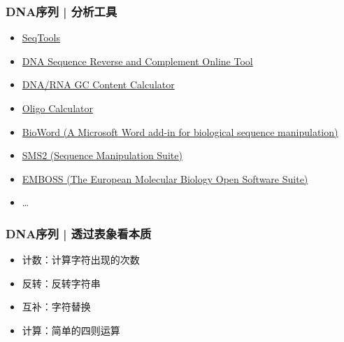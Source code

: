 \begin{frame}
  \frametitle{DNA序列 | 分析工具}
  \begin{itemize}
    \item \href{http://lh3lh3.users.sourceforge.net/fasta.shtml}{SeqTools}
    \item \href{http://www.cellbiol.com/scripts/complement/dna\_sequence\_reverse\_complement.php}{DNA Sequence Reverse and Complement Online Tool}
    \item \href{http://www.endmemo.com/bio/gc.php}{DNA/RNA GC Content Calculator}
    \item \href{http://www.sciencelauncher.com/oligocalc.html}{Oligo Calculator}
    \item \href{http://erilllab.umbc.edu/bioword-2/}{BioWord (A Microsoft Word add-in for biological sequence manipulation)}
    \item \href{http://www.bioinformatics.org/sms2/}{SMS2 (Sequence Manipulation Suite)}
    \item \href{http://emboss.sourceforge.net/}{EMBOSS (The European Molecular Biology Open Software Suite)}
    \item \ldots
  \end{itemize}
\end{frame}

\begin{frame}
  \frametitle{DNA序列 | 透过表象看本质}
  \begin{itemize}
    \item 计数：计算字符出现的次数
    \item 反转：反转字符串
    \item 互补：字符替换
    \item 计算：简单的四则运算
  \end{itemize}
\end{frame}

